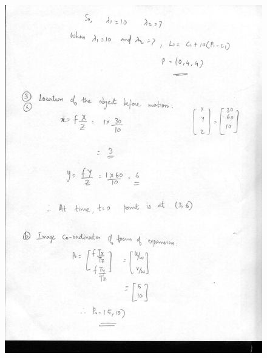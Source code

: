 \documentclass{article}
\begin{document}
\begin{figure}
\includegraphics[width=15cm]{4.jpg}
\end{figure}
\end{document}
